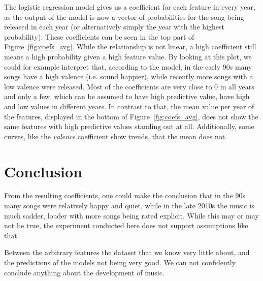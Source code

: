 \documentclass{article}
\begin{document}
The logistic regression model gives us a coefficient for each feature in every year, as the output of the model is now a vector of probabilities for the song being released in each year (or alternatively simply the year with the highest probability). These coefficients can be seen in the top part of Figure~\ref{fig:coefs_avg}. While the relationship is not linear, a high coefficient still means a high probability given a high feature value. By looking at this plot, we could for example interpret that, according to the model, in the early 90s many songs have a high valence (i.e. sound happier), while recently more songs with a low valence were released.
Most of the coefficients are very close to 0 in all years and only a few, which can be assumed to have high predictive value, have high and low values in different years. 
In contrast to that, the mean value per year of the features, displayed in the bottom of Figure~\ref{fig:coefs_avg}, does not show the same features with high predictive values standing out at all. Additionally, some curves, like the \emph{valence} coefficient show trends, that the mean does not.


\section{Conclusion}

From the resulting coefficients, one could make the conclusion that in the 90s many songs were relatively happy and quiet, while in the late 2010s the music is much sadder, louder with more songs being rated explicit. While this may or may not be true, the experiment conducted here does not support assumptions like that.

Between the arbitrary features the dataset that we know very little about, and the predictions of the models not being very good. We can not confidently conclude anything about the development of music.

 
\end{document}
